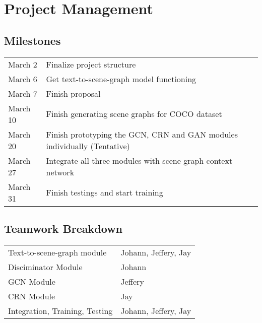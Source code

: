 \documentclass{article}
\begin{document}
\section{Project Management}

\subsection{Milestones}

\begin{tabular}{ll}
March 2 & Finalize project structure\\
March 6 & Get text-to-scene-graph model functioning\\
March 7 & Finish proposal\\
March 10 & Finish generating scene graphs for COCO dataset\\
March 20 & Finish prototyping the GCN, CRN and GAN modules individually (Tentative)\\
March 27 & Integrate all three modules with scene graph context network\\
March 31 & Finish testings and start training
\end{tabular}

\subsection{Teamwork Breakdown}

\begin{tabular}{ll}
Text-to-scene-graph module & Johann, Jeffery, Jay\\
Disciminator Module & Johann\\
GCN Module & Jeffery\\
CRN Module & Jay\\
Integration, Training, Testing & Johann, Jeffery, Jay
\end{tabular}
\end{document}
